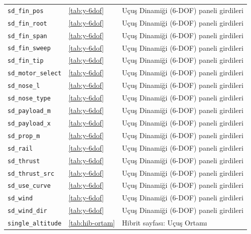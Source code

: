 \documentclass[11pt,a4paper]{article}
\begin{document}
{\begin{longtable}{@{}>{\raggedright\arraybackslash}p{5.2cm}p{1.4cm}>{\raggedright\arraybackslash}p{7.4cm}@{}}
\texttt{sd\_\allowbreak{}fin\_\allowbreak{}pos} & \ref{tab:y-6dof} & Uçuş Dinamiği (6-DOF) paneli girdileri \\
\texttt{sd\_\allowbreak{}fin\_\allowbreak{}root} & \ref{tab:y-6dof} & Uçuş Dinamiği (6-DOF) paneli girdileri \\
\texttt{sd\_\allowbreak{}fin\_\allowbreak{}span} & \ref{tab:y-6dof} & Uçuş Dinamiği (6-DOF) paneli girdileri \\
\texttt{sd\_\allowbreak{}fin\_\allowbreak{}sweep} & \ref{tab:y-6dof} & Uçuş Dinamiği (6-DOF) paneli girdileri \\
\texttt{sd\_\allowbreak{}fin\_\allowbreak{}tip} & \ref{tab:y-6dof} & Uçuş Dinamiği (6-DOF) paneli girdileri \\
\texttt{sd\_\allowbreak{}motor\_\allowbreak{}select} & \ref{tab:y-6dof} & Uçuş Dinamiği (6-DOF) paneli girdileri \\
\texttt{sd\_\allowbreak{}nose\_\allowbreak{}l} & \ref{tab:y-6dof} & Uçuş Dinamiği (6-DOF) paneli girdileri \\
\texttt{sd\_\allowbreak{}nose\_\allowbreak{}type} & \ref{tab:y-6dof} & Uçuş Dinamiği (6-DOF) paneli girdileri \\
\texttt{sd\_\allowbreak{}payload\_\allowbreak{}m} & \ref{tab:y-6dof} & Uçuş Dinamiği (6-DOF) paneli girdileri \\
\texttt{sd\_\allowbreak{}payload\_\allowbreak{}x} & \ref{tab:y-6dof} & Uçuş Dinamiği (6-DOF) paneli girdileri \\
\texttt{sd\_\allowbreak{}prop\_\allowbreak{}m} & \ref{tab:y-6dof} & Uçuş Dinamiği (6-DOF) paneli girdileri \\
\texttt{sd\_\allowbreak{}rail} & \ref{tab:y-6dof} & Uçuş Dinamiği (6-DOF) paneli girdileri \\
\texttt{sd\_\allowbreak{}thrust} & \ref{tab:y-6dof} & Uçuş Dinamiği (6-DOF) paneli girdileri \\
\texttt{sd\_\allowbreak{}thrust\_\allowbreak{}src} & \ref{tab:y-6dof} & Uçuş Dinamiği (6-DOF) paneli girdileri \\
\texttt{sd\_\allowbreak{}use\_\allowbreak{}curve} & \ref{tab:y-6dof} & Uçuş Dinamiği (6-DOF) paneli girdileri \\
\texttt{sd\_\allowbreak{}wind} & \ref{tab:y-6dof} & Uçuş Dinamiği (6-DOF) paneli girdileri \\
\texttt{sd\_\allowbreak{}wind\_\allowbreak{}dir} & \ref{tab:y-6dof} & Uçuş Dinamiği (6-DOF) paneli girdileri \\
\texttt{single\_\allowbreak{}altitude} & \ref{tab:hib-ortam} & Hibrit sayfası: Uçuş Ortamı \\

\end{longtable}}
\end{document}
